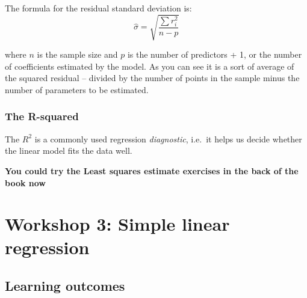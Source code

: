 \documentclass[
]{gitbook}
\begin{document}
The formula for the residual standard deviation is:
\[\hat{\sigma}=\sqrt{\frac{\sum r_i^2}{n-p}}\]

where \(n\) is the sample size and \(p\) is the number of predictors + 1, or the number of coefficients estimated by the model. As you can see it is a sort of average of the squared residual -- divided by the number of points in the sample minus the number of parameters to be estimated.



\hypertarget{the-r-squared}{%
\subsubsection{The R-squared}\label{the-r-squared}}

The \(R^2\) is a commonly used regression \emph{diagnostic}, i.e.~it helps us decide whether the linear model fits the data well.


\textbf{You could try the Least squares estimate exercises in the back of the book now}

\hypertarget{workshop-3-simple-linear-regression}{%
\section{Workshop 3: Simple linear regression}\label{workshop-3-simple-linear-regression}}

\hypertarget{learning-outcomes-4}{%
\subsection{Learning outcomes}\label{learning-outcomes-4}}
\end{document}
